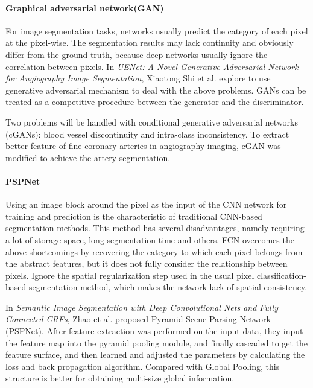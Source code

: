 \documentclass[lang=cn,11pt,a4paper,cite=numbers]{elegantpaper}
\begin{document}
\paragraph{Graphical adversarial network(GAN)}

For image segmentation tasks, networks usually predict the category of each pixel at the pixel-wise. The segmentation results may lack continuity and obviously differ from the ground-truth, because deep networks usually ignore the correlation between pixels. In \emph{UENet: A Novel Generative Adversarial Network for Angiography Image Segmentation}\cite{17}, Xiaotong Shi et al. explore to use generative adversarial mechanism to deal with the above problems. GANs can be treated as a competitive procedure between the generator and the discriminator. 

Two problems will be handled with conditional generative adversarial networks (cGANs): blood vessel discontinuity and intra-class inconsistency. To extract better feature of fine coronary arteries in angiography imaging, cGAN was modified to achieve the artery segmentation.

\paragraph{PSPNet}

Using an image block around the pixel as the input of the CNN network for training and prediction is the characteristic of traditional CNN-based segmentation methods. This method has several disadvantages, namely requiring a lot of storage space, long segmentation time and others. FCN overcomes the above shortcomings by recovering the category to which each pixel belongs from the abstract features, but it does not fully consider the relationship between pixels. Ignore the spatial regularization step used in the usual pixel classification-based segmentation method, which makes the network lack of spatial consistency.

In \emph{Semantic Image Segmentation with Deep Convolutional Nets and Fully Connected CRFs}\cite{18}, Zhao et al. proposed Pyramid Scene Parsing Network (PSPNet). After feature extraction was performed on the input data, they input the feature map into the pyramid pooling module, and finally cascaded to get the feature surface, and then learned and adjusted the parameters by calculating the loss and back propagation algorithm. Compared with Global Pooling, this structure is better for obtaining multi-size global information.
\end{document}
